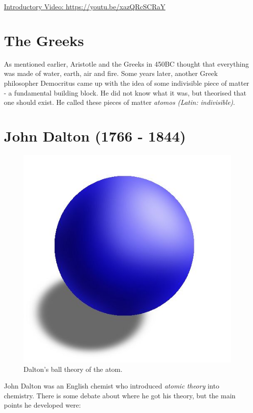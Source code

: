 \documentclass[12pt]{report}
\begin{document}
\noindent\href{https://youtu.be/xazQRcSCRaY}{Introductory Video: https://youtu.be/xazQRcSCRaY}

\section{The Greeks}
As mentioned earlier, Aristotle and the Greeks in 450BC thought that everything was made of water, earth, air and fire. Some years later, another Greek philosopher Democritus came up with the idea of some indivisible piece of matter - a fundamental building block. He did not know what it was, but theorised that one should exist. He called these pieces of matter \textit{atomos (Latin: indivisible)}.

\section{John Dalton (1766 - 1844)}

\begin{figure}
	\vspace{-1cm}
	\begin{center}
		\includegraphics[width=0.9\linewidth]{dalton-model.jpg}
		\caption{Dalton's ball theory of the atom.}
	\end{center}
\end{figure}

John Dalton was an English chemist who introduced \textit{atomic theory} into chemistry. There is some debate about where he got his theory, but the main points he developed were:
\end{document}
